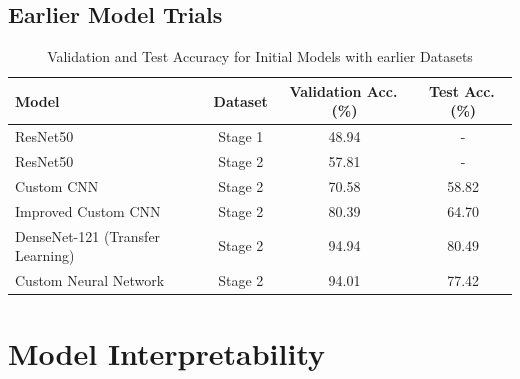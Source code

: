 \documentclass[a4paper,12pt]{report}
\begin{document}
\subsection{Earlier Model Trials}
\begin{table}[htbp]
  \centering
  \caption{Validation and Test Accuracy for Initial Models with earlier Datasets}
  \label{tab:earlier_trials}
  \begin{tabular}{lccc}
    \toprule
    \textbf{Model} & \textbf{Dataset} & \textbf{Validation Acc.\,(\%)} & \textbf{Test Acc.\,(\%)} \\
    \midrule
    ResNet50 & Stage 1 & 48.94 & - \\
    ResNet50 & Stage 2 & 57.81 & - \\
    Custom CNN & Stage 2 & 70.58 & 58.82 \\
    Improved Custom CNN & Stage 2 & 80.39 & 64.70 \\
    DenseNet-121 (Transfer Learning) & Stage 2 & 94.94 & 80.49 \\
    Custom Neural Network & Stage 2 & 94.01 & 77.42 \\
    \bottomrule
  \end{tabular}
\end{table}

\section{Model Interpretability}

\end{document}
